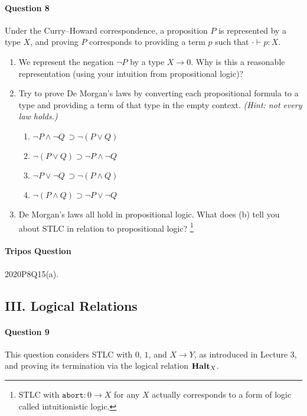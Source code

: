 \documentclass[11pt,a4paper,twoside]{article}
\begin{document}
\paragraph{Question 8} 
Under the Curry--Howard correspondence, a proposition $P$ is represented by a
type $X$, and proving $P$ corresponds to providing a term $p$ such that $\cdot
\vdash p : X$.
\begin{enumerate}[label=(\alph*)]
    \item We represent the negation $\neg P$ by a type $X \to 0$. Why is
        this a reasonable representation (using your intuition from
        propositional logic)?

    \item Try to prove De Morgan's laws by converting each propositional
        formula to a type and providing a term of that type in the empty
        context. \emph{(Hint: not every law holds.)}
        \begin{enumerate}[label=(\roman*)]
            \item $\neg P \land \neg Q \, \supset \neg (P \lor Q)$
            \item $\neg (P \lor Q) \supset \neg P \land \neg Q$
            \item $\neg P \lor \neg Q \, \supset \neg (P \land Q)$
            \item $\neg (P \land Q) \supset \neg P \lor \neg Q$
        \end{enumerate}

    \item De Morgan's laws all hold in propositional logic. What does (b)
        tell you about STLC in relation to propositional logic?
    \footnote{
      STLC with $\texttt{abort} : 0 \to X$ for any $X$ actually corresponds
      to a form of logic called intuitionistic logic.}
\end{enumerate}

\paragraph{Tripos Question} 2020P8Q15(a).

\subsection*{III. Logical Relations}

\paragraph{Question 9} This question considers STLC with $0$, $1$, and $X \to Y$, as introduced in Lecture 3, and proving its termination via the logical relation $\textbf{Halt}_X$.
\end{document}
